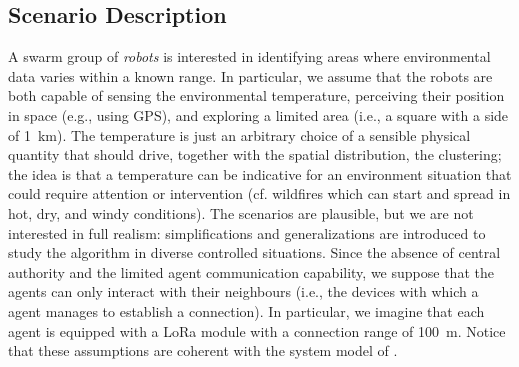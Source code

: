 \subsection{Scenario Description}\label{s:scenario-description}
%
A swarm group of \emph{robots} is interested in identifying areas
 where environmental data varies within a known range.
%
In particular, we assume that the robots are both
 capable of sensing the environmental temperature,
 perceiving their position in space (e.g., using GPS),
 and exploring a limited area (i.e., a square with a side of \SI{1}{\kilo\metre}).
%
The temperature is just an arbitrary choice of
 a sensible physical quantity
 that should drive, together with the spatial distribution,
 the clustering;
 the idea is that a temperature can be indicative for
 an environment situation that could require attention or intervention (cf. wildfires which can start and spread in hot, dry, and windy conditions).
%
The scenarios are plausible, but we are not interested in full realism: simplifications and generalizations are introduced to study the algorithm in diverse controlled situations.
%
Since the absence of central authority and the limited agent communication capability,
 we suppose that the agents can only interact with their neighbours
 (i.e., the devices with which a agent manages to establish a connection).
In particular, we imagine that each agent is equipped with a LoRa module with
 a connection range of \SI{100}{\metre}.
%
%
Notice that these assumptions are coherent with the system model of .

